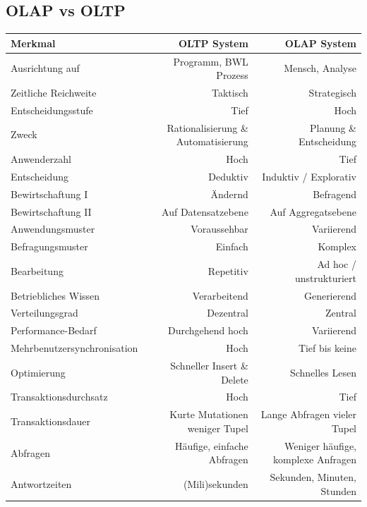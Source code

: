\documentclass[a4paper, 11pt, nofootinbib]{article}
\begin{document}
\begin{landscape}
\subsection{OLAP vs OLTP}
	
	\centering
	
	\begin{tabular}[htbp]{|l|r|r|}
		\hline 
		Merkmal & OLTP System  & OLAP System  \\ 
		\hline 
		Ausrichtung auf & Programm, BWL Prozess & Mensch, Analyse\\ 
		\hline 
		Zeitliche Reichweite & Taktisch & Strategisch \\ 
		\hline 
		Entscheidungsstufe & Tief & Hoch \\ 
		\hline
		Zweck & Rationalisierung \& Automatisierung & Planung \& Entscheidung \\
		\hline
		Anwenderzahl &Hoch & Tief \\
		\hline
		Entscheidung & Deduktiv & Induktiv / Explorativ \\
		\hline
		Bewirtschaftung I & Ändernd & Befragend \\
		\hline
		Bewirtschaftung II & Auf Datensatzebene & Auf Aggregatsebene \\
		\hline
		Anwendungsmuster & Voraussehbar & Variierend \\
		\hline
		Befragungsmuster & Einfach & Komplex \\
		\hline
		Bearbeitung & Repetitiv & Ad hoc / unstrukturiert \\
		\hline
		Betriebliches Wissen & Verarbeitend & Generierend \\
		\hline
		Verteilungsgrad & Dezentral & Zentral \\
		\hline
		Performance-Bedarf & Durchgehend hoch & Variierend \\
		\hline
		Mehrbenutzersynchronisation & Hoch & Tief bis keine \\
		\hline
		Optimierung & Schneller Insert \& Delete & Schnelles Lesen \\
		\hline
		Transaktionsdurchsatz & Hoch & Tief \\
		\hline
		Transaktionsdauer & Kurte Mutationen weniger Tupel & Lange Abfragen vieler Tupel \\
		\hline
		Abfragen & Häufige, einfache Abfragen & Weniger häufige, komplexe Anfragen \\
		\hline
		Antwortzeiten & (Mili)sekunden & Sekunden, Minuten, Stunden \\

\end{tabular}
\end{landscape}
\end{document}
